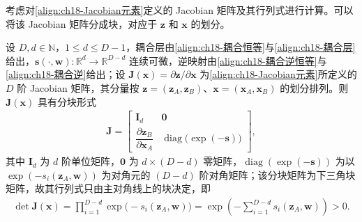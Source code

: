 \documentclass[../../main.tex]{subfiles}
\begin{document}
考虑对\eqref{align:ch18-Jacobian元素}定义的 Jacobian 矩阵及其行列式进行计算。可以将该 Jacobian 矩阵分成块，对应于 $\bm{z}$ 和 $\bm{x}$ 的划分。

\begin{proposition}\label{proposition:ch18-耦合层行列式}
设 $D,d\in\mathbb{N}$，$1\leqslant d\leqslant D-1$，耦合层由\eqref{align:ch18-耦合恒等}与\eqref{align:ch18-耦合层}给出，$\bm{s}(\cdot,\bm{w}):\mathbb{R}^{d}\to\mathbb{R}^{D-d}$ 连续可微，逆映射由\eqref{align:ch18-耦合逆恒等}与\eqref{align:ch18-耦合逆}给出；设 $\bm{J}(\bm{x})=\partial\bm{z}/\partial\bm{x}$ 为\eqref{align:ch18-Jacobian元素}所定义的 $D$ 阶 Jacobian 矩阵，其分量按 $\bm{z}=(\bm{z}_A,\bm{z}_B)$、$\bm{x}=(\bm{x}_A,\bm{x}_B)$ 的划分排列。则 $\bm{J}(\bm{x})$ 具有分块形式
\begin{align}
  \bm{J}=\begin{bmatrix}\bm{I}_d & \bm{0}\\[2pt] \dfrac{\partial\bm{z}_B}{\partial\bm{x}_A} & \operatorname{diag}\big(\exp(-\bm{s})\big)\end{bmatrix},
  \label{align:ch18-耦合Jacobian}
\end{align}
其中 $\bm{I}_d$ 为 $d$ 阶单位矩阵，$\bm{0}$ 为 $d\times(D-d)$ 零矩阵，$\operatorname{diag}(\exp(-\bm{s}))$ 为以 $\exp(-s_{i}(\bm{z}_A,\bm{w}))$ 为对角元的 $(D-d)$ 阶对角矩阵；该分块矩阵为下三角块矩阵，故其行列式只由主对角线上的块决定，即
\begin{align}
  \det\bm{J}(\bm{x})=\prod_{i=1}^{D-d}\exp\big(-s_i(\bm{z}_A,\bm{w})\big)=\exp\left(-\sum_{i=1}^{D-d}s_i(\bm{z}_A,\bm{w})\right)>0.\label{align:ch18-耦合行列式}
\end{align}
\end{proposition}
\end{document}

